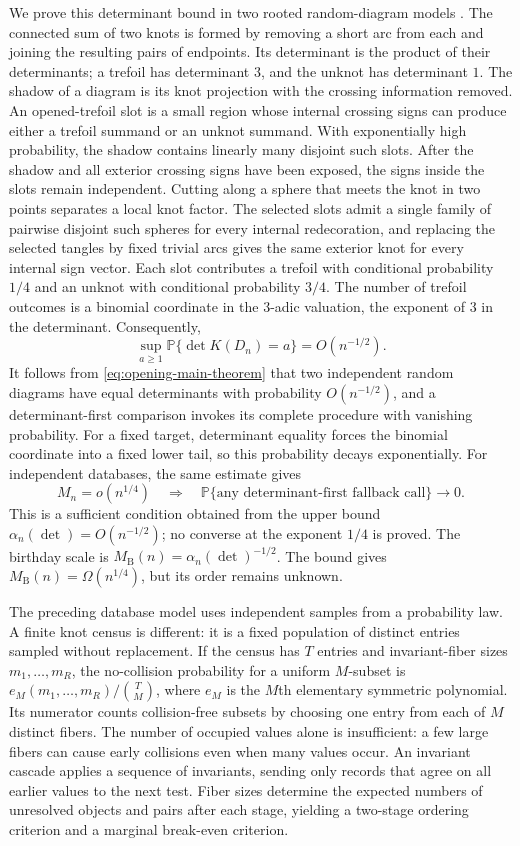 \documentclass[9pt,twoside]{pnas-new}
\theoremstyle{definition}
\theoremstyle{remark}
\renewcommand{\Pr}{\mathbb{P}}
\begin{document}
We prove this determinant bound in two rooted random-diagram models \cite{cantarellachapmanmastin2016,chapman2017}. The connected sum of two knots is formed by removing a short arc from each and joining the resulting pairs of endpoints. Its determinant is the product of their determinants; a trefoil has determinant $3$, and the unknot has determinant $1$. The shadow of a diagram is its knot projection with the crossing information removed. An opened-trefoil slot is a small region whose internal crossing signs can produce either a trefoil summand or an unknot summand. With exponentially high probability, the shadow contains linearly many disjoint such slots. After the shadow and all exterior crossing signs have been exposed, the signs inside the slots remain independent. Cutting along a sphere that meets the knot in two points separates a local knot factor. The selected slots admit a single family of pairwise disjoint such spheres for every internal redecoration, and replacing the selected tangles by fixed trivial arcs gives the same exterior knot for every internal sign vector. Each slot contributes a trefoil with conditional probability $1/4$ and an unknot with conditional probability $3/4$. The number of trefoil outcomes is a binomial coordinate in the $3$-adic valuation, the exponent of $3$ in the determinant. Consequently,
\begin{equation}
 \sup_{a\ge1}\Pr\{\det K(D_n)=a\}=O(n^{-1/2}).
 \label{eq:opening-main-theorem}
\end{equation}
It follows from \eqref{eq:opening-main-theorem} that two independent random diagrams have equal determinants with probability $O(n^{-1/2})$, and a determinant-first comparison invokes its complete procedure with vanishing probability. For a fixed target, determinant equality forces the binomial coordinate into a fixed lower tail, so this probability decays exponentially. For independent databases, the same estimate gives
\[
 M_n=o(n^{1/4})
 \quad\Longrightarrow\quad
 \Pr\{\text{any determinant-first fallback call}\}\to0.
\]
This is a sufficient condition obtained from the upper bound $\alpha_n(\det)=O(n^{-1/2})$; no converse at the exponent $1/4$ is proved. The birthday scale is $M_{\mathrm B}(n)=\alpha_n(\det)^{-1/2}$. The bound gives $M_{\mathrm B}(n)=\Omega(n^{1/4})$, but its order remains unknown.

The preceding database model uses independent samples from a probability law. A finite knot census is different: it is a fixed population of distinct entries sampled without replacement. If the census has $T$ entries and invariant-fiber sizes $m_1,\ldots,m_R$, the no-collision probability for a uniform $M$-subset is $e_M(m_1,\ldots,m_R)/\binom TM$, where $e_M$ is the $M$th elementary symmetric polynomial. Its numerator counts collision-free subsets by choosing one entry from each of $M$ distinct fibers. The number of occupied values alone is insufficient: a few large fibers can cause early collisions even when many values occur. An invariant cascade applies a sequence of invariants, sending only records that agree on all earlier values to the next test. Fiber sizes determine the expected numbers of unresolved objects and pairs after each stage, yielding a two-stage ordering criterion and a marginal break-even criterion.
\end{document}
